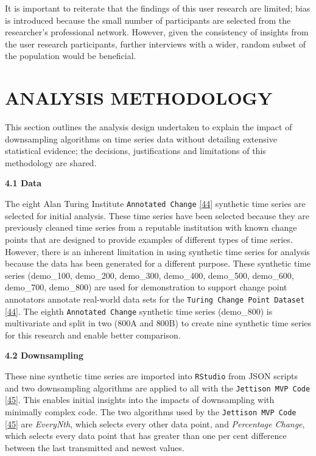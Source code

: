 \documentclass{article}
\begin{document}
It is important to reiterate that the findings of this user research are
limited; bias is introduced because the small number of participants are
selected from the researcher's professional network. However, given the
consistency of insights from the user research participants, further
interviews with a wider, random subset of the population would be
beneficial.

\hypertarget{analysis-methodology}{%
\section{ANALYSIS METHODOLOGY}\label{analysis-methodology}}

This section outlines the analysis design undertaken to explain the
impact of downsampling algorithms on time series data without detailing
extensive statistical evidence; the decisions, justifications and
limitations of this methodology are shared.

\textbf{4.1 Data}

The eight Alan Turing Institute \texttt{Annotated\ Change}
\protect\hyperlink{ref-ATIChangePoint}{{[}44{]}} synthetic time series
are selected for initial analysis. These time series have been selected
because they are previously cleaned time series from a reputable
institution with known change points that are designed to provide
examples of different types of time series. However, there is an
inherent limitation in using synthetic time series for analysis because
the data has been generated for a different purpose. These synthetic
time series (demo\_100, demo\_200, demo\_300, demo\_400, demo\_500,
demo\_600, demo\_700, demo\_800) are used for demonstration to support
change point annotators annotate real-world data sets for the
\texttt{Turing\ Change\ Point\ Dataset}
\protect\hyperlink{ref-ATIChangePoint}{{[}44{]}}. The eighth
\texttt{Annotated\ Change} synthetic time series (demo\_800) is
multivariate and split in two (800A and 800B) to create nine synthetic
time series for this research and enable better comparison.

\textbf{4.2 Downsampling}

These nine synthetic time series are imported into \texttt{RStudio} from
JSON scripts and two downsampling algorithms are applied to all with the
\texttt{Jettison\ MVP\ Code} \protect\hyperlink{ref-Jettison}{{[}45{]}}.
This enables initial insights into the impacts of downsampling with
minimally complex code. The two algorithms used by the
\texttt{Jettison\ MVP\ Code} \protect\hyperlink{ref-Jettison}{{[}45{]}}
are \emph{EveryNth}, which selects every other data point, and
\emph{Percentage Change}, which selects every data point that has
greater than one per cent difference between the last transmitted and
newest values.
\end{document}
